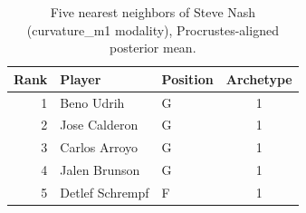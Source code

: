 \begin{table}[htbp]
  \centering\small
  \begin{tabular}{rllc}
    \toprule
    Rank & Player & Position & Archetype \\
    \midrule
    1 & Beno Udrih & G & 1 \\
    2 & Jose Calderon & G & 1 \\
    3 & Carlos Arroyo & G & 1 \\
    4 & Jalen Brunson & G & 1 \\
    5 & Detlef Schrempf & F & 1 \\
    \bottomrule
  \end{tabular}
  \caption{Five nearest neighbors of Steve Nash (curvature_m1 modality), Procrustes-aligned posterior mean.}
  \label{tab:Steve_Nash_neighbors_curvature_m1}
\end{table}

